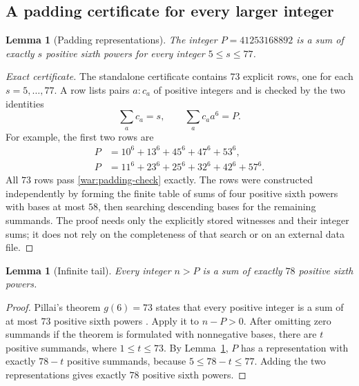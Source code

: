 \documentclass[11pt,a4paper]{article}
\numberwithin{equation}{section}
\newtheorem{lemma}[theorem]{Lemma}
\theoremstyle{remark}
\begin{document}
\subsection{A padding certificate for every larger integer}

\begin{lemma}[Padding representations]\label{war:padding}
The integer $P=41253168892$ is a sum of exactly $s$ positive sixth powers
for every integer $5\leq s\leq77$.
\end{lemma}

\begin{proof}[Exact certificate]
The standalone certificate contains $73$ explicit rows, one for each
$s=5,\ldots,77$. A row lists pairs $a:c_a$ of positive integers and is
checked by the two identities
\begin{equation}\label{war:padding-check}
 \sum_a c_a=s,\qquad \sum_a c_a a^6=P.
\end{equation}
For example, the first two rows are
\begin{align*}
 P&=10^6+13^6+45^6+47^6+53^6,\\
 P&=11^6+23^6+25^6+32^6+42^6+57^6.
\end{align*}
All $73$ rows pass \eqref{war:padding-check} exactly. The rows were
constructed independently by forming the finite table of sums of four
positive sixth powers with bases at most $58$, then searching descending
bases for the remaining summands. The proof needs only the explicitly
stored witnesses and their integer sums; it does not rely on the
completeness of that search or on an external data file.
\end{proof}

\begin{lemma}[Infinite tail]\label{war:tail}
Every integer $n>P$ is a sum of exactly $78$ positive sixth powers.
\end{lemma}

\begin{proof}
Pillai's theorem $g(6)=73$ states that every positive integer is a sum of
at most $73$ positive sixth powers \cite{Pillai1940}. Apply it to $n-P>0$.
After omitting zero summands if the theorem is formulated with nonnegative
bases, there are $t$ positive summands, where $1\leq t\leq73$.
By Lemma~\ref{war:padding}, $P$ has a representation with exactly $78-t$
positive summands, because $5\leq78-t\leq77$.
Adding the two representations gives exactly $78$ positive sixth powers.
\end{proof}
\end{document}
